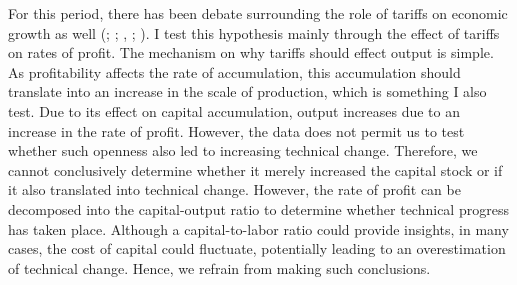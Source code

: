 \documentclass[10pt]{article}
\begin{document}
\par For this period, there has been debate surrounding the role of tariffs on economic growth as well (\citet{bairoch1989european}; \citet{orourke2000globalization}; \citet{ClemensWilliamson2004}, \citet{Jacks2005}; \citet{schularick2011tariffs}). I test this hypothesis mainly through the effect of tariffs on rates of profit. The mechanism on why tariffs should effect output is simple. As profitability affects the rate of accumulation, this accumulation should translate into an increase in the scale of production, which is something I also test. Due to its effect on capital accumulation, output increases due to an increase in the rate of profit. However, the data does not permit us to test whether such openness also led to increasing technical change. Therefore, we cannot conclusively determine whether it merely increased the capital stock or if it also translated into technical change. However, the rate of profit can be decomposed into the capital-output ratio to determine whether technical progress has taken place. Although a capital-to-labor ratio could provide insights, in many cases, the cost of capital could fluctuate, potentially leading to an overestimation of technical change. Hence, we refrain from making such conclusions.  
\end{document}
